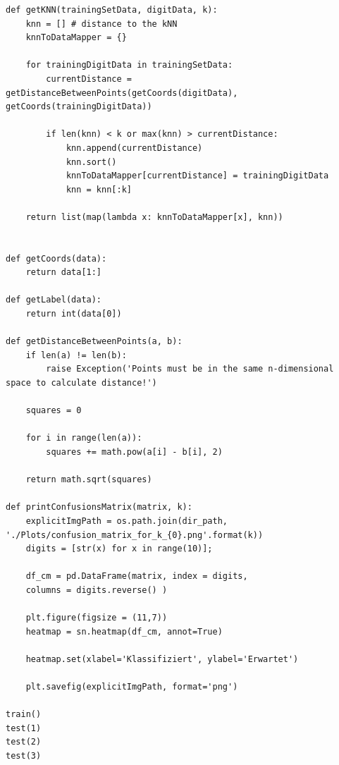 \begin{lstlisting}[style=py]
def getKNN(trainingSetData, digitData, k):
	knn = [] # distance to the kNN
	knnToDataMapper = {}

	for trainingDigitData in trainingSetData:
		currentDistance = getDistanceBetweenPoints(getCoords(digitData), getCoords(trainingDigitData))

		if len(knn) < k or max(knn) > currentDistance:
			knn.append(currentDistance)
			knn.sort()
			knnToDataMapper[currentDistance] = trainingDigitData
			knn = knn[:k]

	return list(map(lambda x: knnToDataMapper[x], knn))


def getCoords(data):
	return data[1:]

def getLabel(data):
	return int(data[0])

def getDistanceBetweenPoints(a, b):
	if len(a) != len(b):
		raise Exception('Points must be in the same n-dimensional space to calculate distance!')

	squares = 0

	for i in range(len(a)):
		squares += math.pow(a[i] - b[i], 2)

	return math.sqrt(squares)

def printConfusionsMatrix(matrix, k):
	explicitImgPath = os.path.join(dir_path, './Plots/confusion_matrix_for_k_{0}.png'.format(k))
	digits = [str(x) for x in range(10)];

	df_cm = pd.DataFrame(matrix, index = digits,
	columns = digits.reverse() )

	plt.figure(figsize = (11,7))
	heatmap = sn.heatmap(df_cm, annot=True)

	heatmap.set(xlabel='Klassifiziert', ylabel='Erwartet')

	plt.savefig(explicitImgPath, format='png')

train()
test(1)
test(2)
test(3)
\end{lstlisting}



